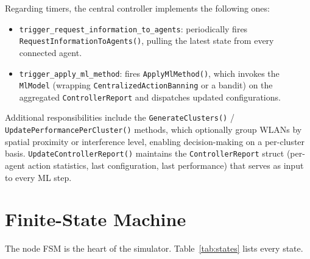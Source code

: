 \documentclass[11pt,a4paper]{article}
\begin{document}
Regarding timers, the central controller implements the following ones:
\begin{itemize}
    \item \texttt{trigger\_request\_information\_to\_agents}: periodically fires \texttt{RequestInformationToAgents()}, pulling the latest state from every connected agent.
    \item \texttt{trigger\_apply\_ml\_method}: fires \texttt{ApplyMlMethod()}, which invokes the \texttt{MlModel} (wrapping \texttt{CentralizedActionBanning} or a bandit) on the aggregated \texttt{ControllerReport} and dispatches updated configurations.
\end{itemize}

Additional responsibilities include the \texttt{GenerateClusters()} / \texttt{UpdatePerformancePerCluster()} methods, which optionally group WLANs by spatial proximity or interference level, enabling decision-making on a per-cluster basis. \texttt{UpdateControllerReport()} maintains the \texttt{ControllerReport} struct (per-agent action statistics, last configuration, last performance) that serves as input to every ML step.


\section{Finite-State Machine}
\label{sec:fsm}

The node FSM is the heart of the simulator.  Table~\ref{tab:states} lists every state.
\end{document}
